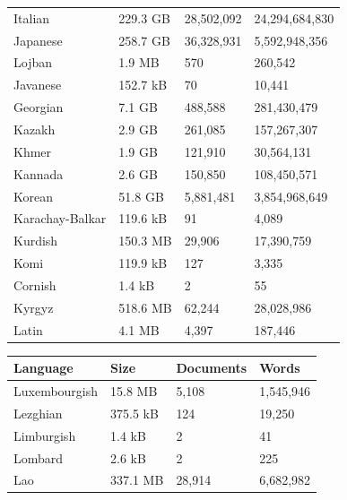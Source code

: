 \begin{table}[t!]
\begin{tabular}{llll}
        Italian                     & 229.3 GB  & 28,502,092  & 24,294,684,830  \\
        Japanese                    & 258.7 GB  & 36,328,931  & 5,592,948,356   \\
        Lojban                      & 1.9 MB    & 570         & 260,542         \\
        Javanese                    & 152.7 kB  & 70          & 10,441          \\
        Georgian                    & 7.1 GB    & 488,588     & 281,430,479     \\
        Kazakh                      & 2.9 GB    & 261,085     & 157,267,307     \\
        Khmer                       & 1.9 GB    & 121,910     & 30,564,131      \\
        Kannada                     & 2.6 GB    & 150,850     & 108,450,571     \\
        Korean                      & 51.8 GB   & 5,881,481   & 3,854,968,649   \\
        Karachay-Balkar             & 119.6 kB  & 91          & 4,089           \\
        Kurdish                     & 150.3 MB  & 29,906      & 17,390,759      \\
        Komi                        & 119.9 kB  & 127         & 3,335           \\
        Cornish                     & 1.4 kB    & 2           & 55              \\
        Kyrgyz                      & 518.6 MB  & 62,244      & 28,028,986      \\
        Latin                       & 4.1 MB    & 4,397       & 187,446         \\
        \bottomrule
    \end{tabular}
    \begin{tabular}{llll}
        \toprule
        Language          & Size      & Documents  & Words          \\
        \midrule
        Luxembourgish     & 15.8 MB   & 5,108      & 1,545,946      \\
        Lezghian          & 375.5 kB  & 124        & 19,250         \\
        Limburgish        & 1.4 kB    & 2          & 41             \\
        Lombard           & 2.6 kB    & 2          & 225            \\
        Lao               & 337.1 MB  & 28,914     & 6,682,982      \\

\end{tabular}
\end{table}
